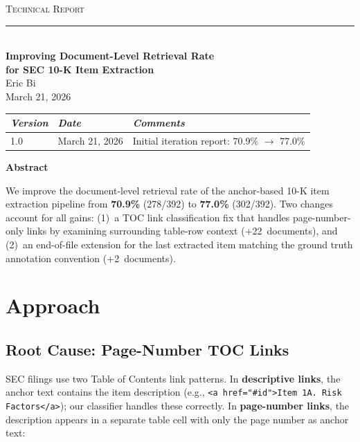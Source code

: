 \documentclass[11pt,a4paper]{article}
\begin{document}
\begin{center}
{\small\scshape Technical Report}\\[2pt]
\rule{\textwidth}{0.5pt}\\[12pt]
{\LARGE\bfseries Improving Document-Level Retrieval Rate\\[6pt]
for SEC 10-K Item Extraction}\\[12pt]
Eric Bi\\
March 21, 2026\\[8pt]
\end{center}

\vspace{4pt}
\noindent
\begin{tabular}{@{}lll@{}}
\toprule
\textit{Version} & \textit{Date} & \textit{Comments}\\
\midrule
1.0 & March 21, 2026 & Initial iteration report: 70.9\% $\to$ 77.0\%\\
\bottomrule
\end{tabular}

\vspace{12pt}
\begin{center}\textbf{Abstract}\end{center}

\noindent
We improve the document-level retrieval rate of the anchor-based 10-K item extraction pipeline from \textbf{70.9\%} (278/392) to \textbf{77.0\%} (302/392). Two changes account for all gains: (1)~a TOC link classification fix that handles page-number-only links by examining surrounding table-row context (+22~documents), and (2)~an end-of-file extension for the last extracted item matching the ground truth annotation convention (+2~documents).

\section{Approach}

\subsection{Root Cause: Page-Number TOC Links}

SEC filings use two Table of Contents link patterns. In \textbf{descriptive links}, the anchor text contains the item description (e.g., \texttt{<a href="\#id">Item~1A. Risk Factors</a>}); our classifier handles these correctly. In \textbf{page-number links}, the description appears in a separate table cell with only the page number as anchor text:
\end{document}
